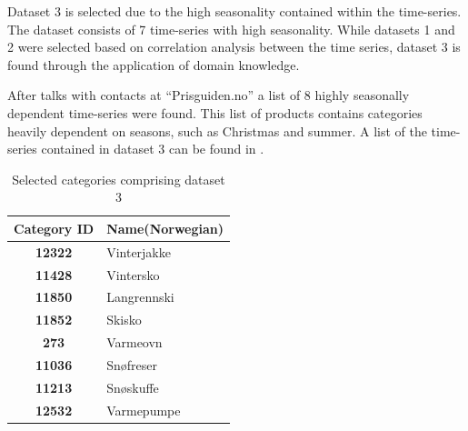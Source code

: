 Dataset 3 is selected due to the high seasonality contained within the time-series.
The dataset consists of 7 time-series with high seasonality.
While datasets 1 and 2 were selected based on correlation analysis between the time series,
dataset 3 is found through the application of domain knowledge.

After talks with contacts at ``Prisguiden.no'' a list of 8 highly seasonally dependent time-series were found.
This list of products contains categories heavily dependent on seasons, such as Christmas and summer.
A list of the time-series contained in dataset 3 can be found in .


\begin{table}[H]
  \centering
  \caption{Selected categories comprising dataset 3}
  \label{table:dataset3}
  \begin{tabular}{|c|l|}\hline
    Category ID      & Name(Norwegian) \\ \hline
    \textbf{12322  } & Vinterjakke     \\ \hline
    \textbf{11428  } & Vintersko       \\ \hline
    \textbf{11850  } & Langrennski     \\ \hline
    \textbf{11852  } & Skisko          \\ \hline
    \textbf{273    } & Varmeovn        \\ \hline
    \textbf{11036  } & Snøfreser       \\ \hline
    \textbf{11213  } & Snøskuffe       \\ \hline
    \textbf{12532  } & Varmepumpe      \\ \hline
  \end{tabular}
\end{table}


